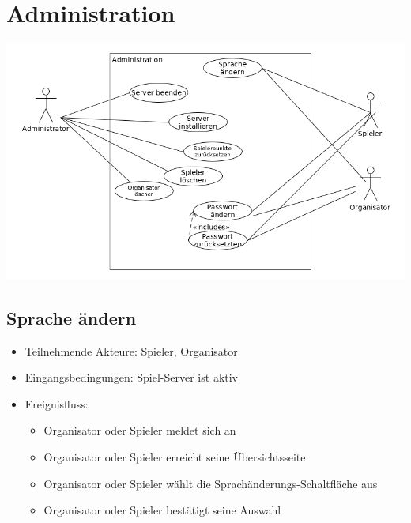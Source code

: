 \documentclass[a4paper]{scrreprt}
\begin{document}
    \section{Administration}
    \includegraphics[width=\textwidth]{uml/export/Administration.png}
     \subsection{Sprache ändern}
    \begin{itemize}
    \item Teilnehmende Akteure: \Gls{Spieler}, \Gls{Organisator}
    \item Eingangsbedingungen: Spiel-Server ist aktiv
    \item Ereignisfluss:
        \begin{itemize}
            \item \Gls{Organisator} oder \Gls{Spieler} meldet sich an
            \item \Gls{Organisator} oder \Gls{Spieler} erreicht seine Übersichtsseite
            \item \Gls{Organisator} oder \Gls{Spieler} wählt die Sprachänderungs-Schaltfläche aus
            \item \Gls{Organisator} oder \Gls{Spieler} bestätigt seine Auswahl
        \end{itemize}
    \end{itemize}
\end{document}
